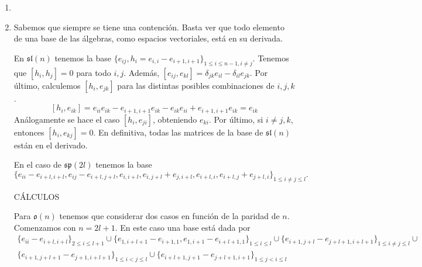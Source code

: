 \documentclass[twoside]{article}
\begin{document}
\begin{solucion}
\begin{enumerate}
\item[]
\item Sabemos que siempre se tiene una contención. Basta ver que todo elemento de una base de las álgebras, como espacios vectoriales, está en su derivada. 

En $\mathfrak{sl}(n)$ tenemos la base $\{e_{ij}, h_i=e_{i,i}-e_{i+1,i+1}\}_{1\leq i\leq n-1, i\neq j}$. Tenemos que $[h_i,h_j]=0$ para todo $i,j$. Además, $[e_{ij},e_{kl}]=\delta_{jk}e_{il}-\delta_{il}e_{jk}$. Por último, calculemos $[h_i,e_{jk}]$ para las distintas posibles combinaciones de $i,j,k$. $$[h_i,e_{ik}]=e_{ii}e_{ik}-e_{i+1,i+1}e_{ik}-e_{ik}e_{ii}+e_{i+1,i+1}e_{ik}=e_{ik}$$
Análogamente se hace el caso $[h_i,e_{ji}]$, obteniendo $e_{ki}$. Por último, si $i\neq j,k$, entonces $[h_i,e_{kj}]=0$. En definitiva, todas las matrices de la base de $\mathfrak{sl}(n)$ están en el derivado.

%
%

En el caso de $\mathfrak{sp}(2l)$ tenemos la base $$\{e_{ii}-e_{i+l,i+l}, e_{ij}-e_{i+l,j+l},e_{i,i+l}, e_{i,j+l}+e_{j,i+l}, e_{i+l,i}, e_{i+l,j}+e_{j+l,i}\}_{1\leq i\neq j\leq l}.$$

CÁLCULOS

Para $\mathfrak{o}(n)$ tenemos que considerar dos casos en función de la paridad de $n$. Comenzamos con $n=2l+1$. En este caso una base está dada por 
\begin{gather*}
\{e_{ii}-e_{i+l,i+l}\}_{2\leq i\leq l+1}\cup \{e_{1,i+l+1}-e_{i+1,1}, e_{1,i+1}-e_{i+l+1,1}\}_{1\leq i\leq l}\cup\{e_{i+1,j+l}-e_{j+l+1,i+l+1}\}_{1\leq i\neq j\leq l}\cup\\
\{e_{i+1,j+l+1}-e_{j+1,i+l+1}\}_{1\leq i<j\leq l}\cup \{e_{i+l+1,j+1}-e_{j+l+1,i+1}\}_{1\leq j<i\leq l}
\end{gather*}


\end{enumerate}
\end{solucion}
\end{document}
